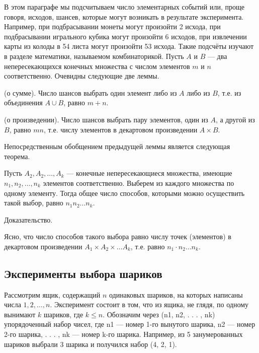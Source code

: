 В этом параграфе мы подсчитываем число элементарных событий или,
проще говоря, исходов, шансев, которые могут возникать в результате эксперимента. Например, при подбрасывании монеты могут произойти 2 исхода,
при подбрасывании игрального кубика могут произойти 6 исходов, при извлечении карты из колоды в 54 листа могут произойти 53 исхода. Такие подсчёты изучают в разделе математики, называемом комбинаторикой.
Пусть $A$ и $B$ — два непересекающихся конечных множества с числом
элементов $m$ и $n$ соответственно. Очевидны следующие две леммы.



\begin{lemma}(о сумме). Число шансов выбрать один элемент либо из $A$
либо из $B$, т.е. из объединения $A\cup B$, равно $m+n$.
\end{lemma}
\begin{lemma}(о произведении). Число шансов выбрать пару элементов,
один из $A$, а другой из $B$, равно $mn$, т.е. числу элементов в декартовом
произведении $A\times B$.
\end{lemma}
Непосредственным обобщением предыдущей леммы является следующая
теорема.
\begin{theorem}
Пусть $A_2,A_2,\dots,A_k$ — конечные непересекающиеся множества, имеющие $n_1
,n_2, \dots, n_k$ элементов соответственно. Выберем из
каждого множества по одному элементу. Тогда общее число способов, которыми можно осуществить такой выбор, равно $n_1n_2\dots n_k$.
\end{theorem}

Доказательство. 

Ясно, что число способов такого выбора равно числу точек (элементов) в декартовом произведении $A_1\times A_2\times\dots A_k$, т.е. равно $
n_1\cdot n_2\dots n_k$.
\subsection{Эксперименты выбора шариков}
Рассмотрим ящик, содержащий $n$ одинаковых шариков, на которых написаны
числа $1, 2,\dots, n$. Эксперимент состоит в том, что из ящика, не глядя, по
одному вынимают $k$ шариков, где $k ≤ n$. Обозначим через
(n1, n2, . . . , nk)
упорядоченный набор чисел, где n1 — номер 1-го вынутого шарика, n2 —
номер 2-го шарика, . . . , nk — номер k-го шарика.
Например, из 5 занумерованных шариков выбрали 3 шарика и получился
набор (4, 2, 1).

